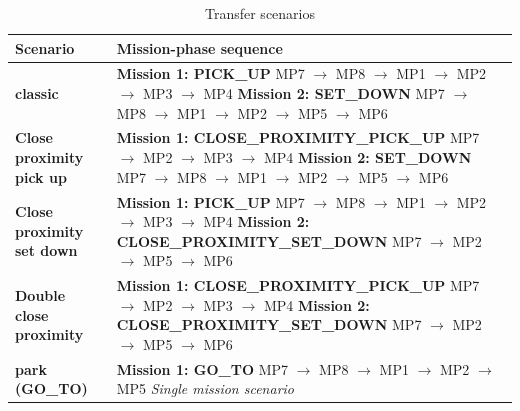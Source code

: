 \begin{table}[H]
  \centering
  \caption{Transfer scenarios}
  \label{tab:transfer-scenarios}
  \renewcommand{\arraystretch}{1.2}
  \begin{tabular}{|p{3cm}|p{11cm}|}
      \hline
      \textbf{Scenario} & \textbf{Mission-phase sequence} \\
      \hline
      \textbf{classic} &
      \parbox[t]{\linewidth}{\textbf{Mission 1: PICK\_UP}\\ MP7 $\rightarrow$ MP8 $\rightarrow$ MP1 $\rightarrow$ MP2 $\rightarrow$ MP3 $\rightarrow$ MP4\\[0.2em]
      \textbf{Mission 2: SET\_DOWN}\\ MP7 $\rightarrow$ MP8 $\rightarrow$ MP1 $\rightarrow$ MP2 $\rightarrow$ MP5 $\rightarrow$ MP6} \\
      \hline
      \textbf{Close proximity pick up} &
      \parbox[t]{\linewidth}{\textbf{Mission 1: CLOSE\_PROXIMITY\_PICK\_UP}\\ MP7 $\rightarrow$ MP2 $\rightarrow$ MP3 $\rightarrow$ MP4\\[0.2em]
      \textbf{Mission 2: SET\_DOWN}\\ MP7 $\rightarrow$ MP8 $\rightarrow$ MP1 $\rightarrow$ MP2 $\rightarrow$ MP5 $\rightarrow$ MP6} \\
      \hline
      \textbf{Close proximity set down} &
      \parbox[t]{\linewidth}{\textbf{Mission 1: PICK\_UP}\\ MP7 $\rightarrow$ MP8 $\rightarrow$ MP1 $\rightarrow$ MP2 $\rightarrow$ MP3 $\rightarrow$ MP4\\[0.2em]
      \textbf{Mission 2: CLOSE\_PROXIMITY\_SET\_DOWN}\\ MP7 $\rightarrow$ MP2 $\rightarrow$ MP5 $\rightarrow$ MP6} \\
      \hline
      \textbf{Double close proximity} &
      \parbox[t]{\linewidth}{\textbf{Mission 1: CLOSE\_PROXIMITY\_PICK\_UP}\\ MP7 $\rightarrow$ MP2 $\rightarrow$ MP3 $\rightarrow$ MP4\\[0.2em]
      \textbf{Mission 2: CLOSE\_PROXIMITY\_SET\_DOWN}\\ MP7 $\rightarrow$ MP2 $\rightarrow$ MP5 $\rightarrow$ MP6} \\
      \hline
      \textbf{park (GO\_TO)} &
      \parbox[t]{\linewidth}{\textbf{Mission 1: GO\_TO}\\ MP7 $\rightarrow$ MP8 $\rightarrow$ MP1 $\rightarrow$ MP2 $\rightarrow$ MP5\\[0.2em]
      \textit{Single mission scenario}} \\
      \hline
    \end{tabular}
  \renewcommand{\arraystretch}{0.85}
\end{table}

